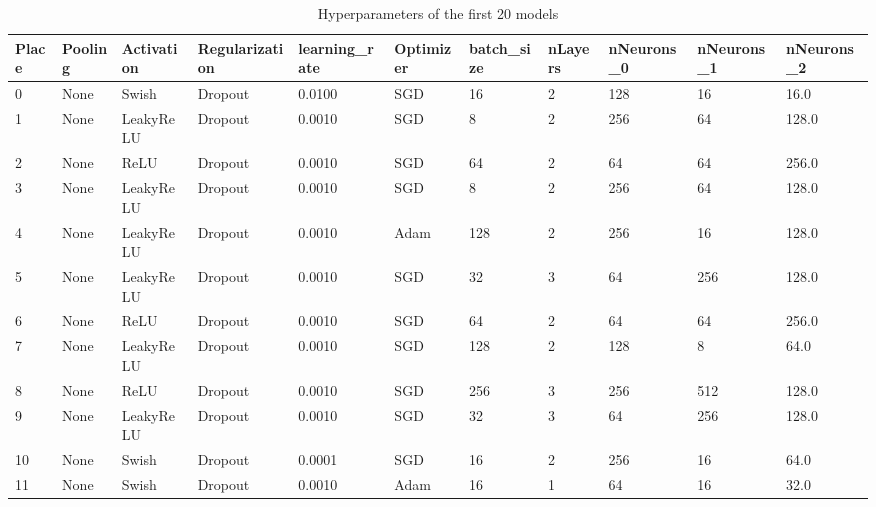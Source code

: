 \documentclass{article}
\begin{document}
\begin{table}
  \caption{Hyperparameters of the first 20 models}
  \label{tab:hyperopt}
  \centering
  \begin{tabular}{lllllllllll}
    \toprule
    Place   & Pooling    & Activation     & Regularization & learning\_rate & Optimizer  & batch\_size & nLayers & nNeurons\_0 & nNeurons\_1 & nNeurons\_2 \\
    \midrule
    0       & None       & Swish          & Dropout        & 0.0100         & SGD        & 16          & 2       & 128         & 16          & 16.0   \\
    1       & None       & LeakyReLU      & Dropout        & 0.0010         & SGD        & 8           & 2       & 256         & 64          & 128.0  \\
    2       & None       & ReLU           & Dropout        & 0.0010         & SGD        & 64          & 2       & 64          & 64          & 256.0  \\
    3       & None       & LeakyReLU      & Dropout        & 0.0010         & SGD        & 8           & 2       & 256         & 64          & 128.0  \\
    4       & None       & LeakyReLU      & Dropout        & 0.0010         & Adam       & 128         & 2       & 256         & 16          & 128.0  \\
    5       & None       & LeakyReLU      & Dropout        & 0.0010         & SGD        & 32          & 3       & 64          & 256         & 128.0  \\
    6       & None       & ReLU           & Dropout        & 0.0010         & SGD        & 64          & 2       & 64          & 64          & 256.0  \\
    7       & None       & LeakyReLU      & Dropout        & 0.0010         & SGD        & 128         & 2       & 128         & 8           & 64.0   \\
    8       & None       & ReLU           & Dropout        & 0.0010         & SGD        & 256         & 3       & 256         & 512         & 128.0  \\
    9       & None       & LeakyReLU      & Dropout        & 0.0010         & SGD        & 32          & 3       & 64          & 256         & 128.0  \\
    10      & None       & Swish          & Dropout        & 0.0001         & SGD        & 16          & 2       & 256         & 16          & 64.0   \\
    11      & None       & Swish          & Dropout        & 0.0010         & Adam       & 16          & 1       & 64          & 16          & 32.0   \\

\end{tabular}
\end{table}
\end{document}
